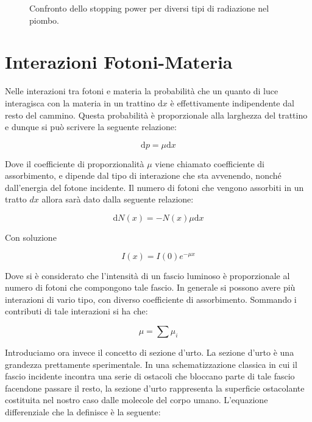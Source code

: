 \documentclass [a4paper, twoside] {book}
\begin{document}
\begin{figure} []
\centering
		\caption{Confronto dello stopping power per diversi tipi di radiazione nel piombo.}
         \label{stoppingpower}
\end{figure}


\section{Interazioni Fotoni-Materia}


Nelle interazioni tra fotoni e materia la probabilità che un quanto di luce interagisca con la materia in un trattino $\mathrm{d}x$ è effettivamente indipendente dal resto del cammino. Questa probabilità è proporzionale alla larghezza del trattino e dunque si può scrivere la seguente relazione:

\begin{equation}
\mathrm{d}p=\mu \mathrm{d}x
\end{equation}

Dove il coefficiente di proporzionalità $\mu$ viene chiamato coefficiente di assorbimento, e dipende dal tipo di interazione che sta avvenendo, nonché dall'energia del fotone incidente. Il numero di fotoni che vengono assorbiti in un tratto $dx$ allora sarà dato dalla seguente relazione:

\begin{equation}
\mathrm{d}N(x)=-N(x)\mu \mathrm{d}x
\end{equation}

Con soluzione

\begin{equation}
I(x)=I(0)e^{-\mu x}
\label{Intensity}
\end{equation}

Dove si è considerato che l'intensità di un fascio luminoso è proporzionale al numero di fotoni che compongono tale fascio.
In generale si possono avere più interazioni di vario tipo, con diverso coefficiente di assorbimento. Sommando i contributi di tale interazioni si ha che:

\begin{equation}
\mu=\sum \mu_{i}
\end{equation}

Introduciamo ora invece il concetto di sezione d'urto. 
La sezione d'urto è una grandezza prettamente sperimentale. In una schematizzazione classica in cui il fascio incidente incontra una serie di ostacoli che bloccano parte di tale fascio facendone passare il resto, la sezione d'urto rappresenta la superficie ostacolante costituita nel nostro caso dalle molecole del corpo umano. L'equazione differenziale che la definisce è la seguente:
\end{document}
